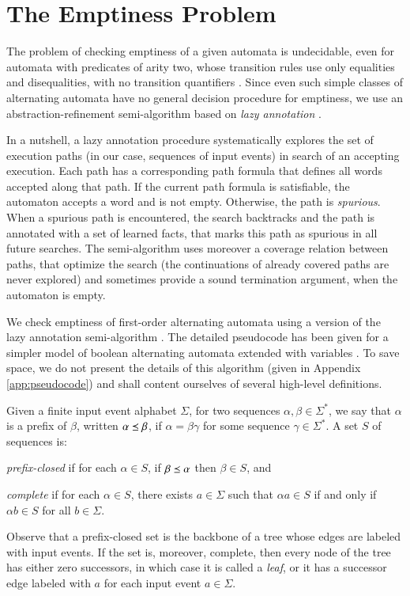 \documentclass{llncs}
\begin{document}
\section{The Emptiness Problem}
\label{sec:emptiness}

The problem of checking emptiness of a given automata is undecidable,
even for automata with predicates of arity two, whose transition rules
use only equalities and disequalities, with no transition quantifiers
\cite{Farzan15}. Since even such simple classes of alternating
automata have no general decision procedure for emptiness, we use an
abstraction-refinement semi-algorithm based on \emph{lazy annotation}
\cite{McMillan06,McMillan14}. 

In a nutshell, a lazy annotation procedure systematically explores the
set of execution paths (in our case, sequences of input events) in
search of an accepting execution. Each path has a corresponding path
formula that defines all words accepted along that path. If the
current path formula is satisfiable, the automaton accepts a word and
is not empty. Otherwise, the path is \emph{spurious}. When a spurious
path is encountered, the search backtracks and the path is annotated
with a set of learned facts, that marks this path as spurious in all
future searches. The semi-algorithm uses moreover a coverage relation
between paths, that optimize the search (the continuations of already
covered paths are never explored) and sometimes provide a sound
termination argument, when the automaton is empty.

We check emptiness of first-order alternating automata using a version
of the \impact~ lazy annotation semi-algorithm \cite{McMillan06}. The
detailed pseudocode has been given for a simpler model of boolean
alternating automata extended with variables \cite{IosifXu18}. To save
space, we do not present the details of this algorithm (given in
Appendix \ref{app:pseudocode}) and shall content ourselves of several
high-level definitions. 

Given a finite input event alphabet $\Sigma$, for two sequences
$\alpha, \beta \in \Sigma^*$, we say that $\alpha$ is a prefix of
$\beta$, written $\alpha \preceq \beta$, if $\alpha=\beta\gamma$ for
some sequence $\gamma\in\Sigma^*$. A set $S$ of sequences
is: \begin{compactitem}
\item \emph{prefix-closed} if for each $\alpha \in S$, if $\beta \preceq
\alpha$ then $\beta \in S$, and
\item \emph{complete} if for each $\alpha \in S$, there exists $a \in
  \Sigma$ such that $\alpha a \in S$ if and only if $\alpha b \in S$
  for all $b \in \Sigma$. 
\end{compactitem}
Observe that a prefix-closed set is the backbone of a tree whose edges
are labeled with input events. If the set is, moreover, complete, then
every node of the tree has either zero successors, in which case it is
called a \emph{leaf}, or it has a successor edge labeled with $a$ for
each input event $a \in \Sigma$. 
\end{document}
